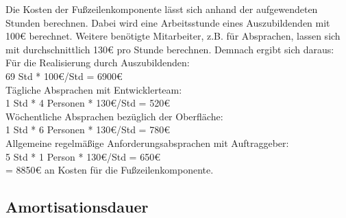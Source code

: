 Die Kosten der Fußzeilenkomponente lässt sich anhand der aufgewendeten Stunden berechnen.
Dabei wird eine Arbeitsstunde eines Auszubildenden mit 100€ berechnet. Weitere benötigte Mitarbeiter, z.B. für Absprachen, lassen sich mit durchschnittlich 130€ pro Stunde berechnen. 
Demnach ergibt sich daraus:\\
Für die Realisierung durch Auszubildenden: \\
69 Std * 100€/Std = 6900€ \\
Tägliche Absprachen mit Entwicklerteam: \\
1 Std * 4 Personen * 130€/Std = 520€\\
Wöchentliche Absprachen bezüglich der Oberfläche:  \\
1 Std * 6 Personen * 130€/Std = 780€\\
Allgemeine regelmäßige Anforderungsabsprachen mit Auftraggeber:  \\
5 Std * 1 Person *  130€/Std = 650€\\

= 8850€ an Kosten für die Fußzeilenkomponente.
\subsection{Amortisationsdauer}
\label{amortisationsdauer}


